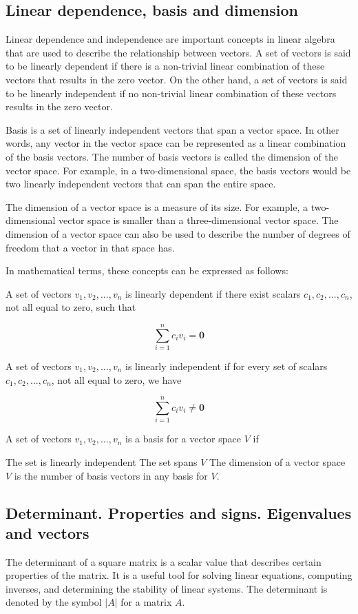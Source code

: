 \documentclass[12pt, a4paper, oneside]{article}
\begin{document}
\subsection{ Linear dependence, basis and dimension }
Linear dependence and independence are important concepts in linear algebra that are used to describe the relationship between vectors. A set of vectors is said to be linearly dependent if there is a non-trivial linear combination of these vectors that results in the zero vector. On the other hand, a set of vectors is said to be linearly independent if no non-trivial linear combination of these vectors results in the zero vector.

Basis is a set of linearly independent vectors that span a vector space. In other words, any vector in the vector space can be represented as a linear combination of the basis vectors. The number of basis vectors is called the dimension of the vector space. For example, in a two-dimensional space, the basis vectors would be two linearly independent vectors that can span the entire space.

The dimension of a vector space is a measure of its size. For example, a two-dimensional vector space is smaller than a three-dimensional vector space. The dimension of a vector space can also be used to describe the number of degrees of freedom that a vector in that space has.

In mathematical terms, these concepts can be expressed as follows:

A set of vectors ${v_1, v_2, ..., v_n}$ is linearly dependent if there exist scalars ${c_1, c_2, ..., c_n}$, not all equal to zero, such that

$$\sum_{i=1}^n c_iv_i = \mathbf{0}$$

A set of vectors ${v_1, v_2, ..., v_n}$ is linearly independent if for every set of scalars ${c_1, c_2, ..., c_n}$, not all equal to zero, we have

$$\sum_{i=1}^n c_iv_i \ne \mathbf{0}$$

A set of vectors ${v_1, v_2, ..., v_n}$ is a basis for a vector space $V$ if

The set is linearly independent
The set spans $V$
The dimension of a vector space $V$ is the number of basis vectors in any basis for $V$.

\subsection{ Determinant. Properties and signs. Eigenvalues and vectors }
The determinant of a square matrix is a scalar value that describes certain properties of the matrix. It is a useful tool for solving linear equations, computing inverses, and determining the stability of linear systems. The determinant is denoted by the symbol $|A|$ for a matrix $A$.
\end{document}

